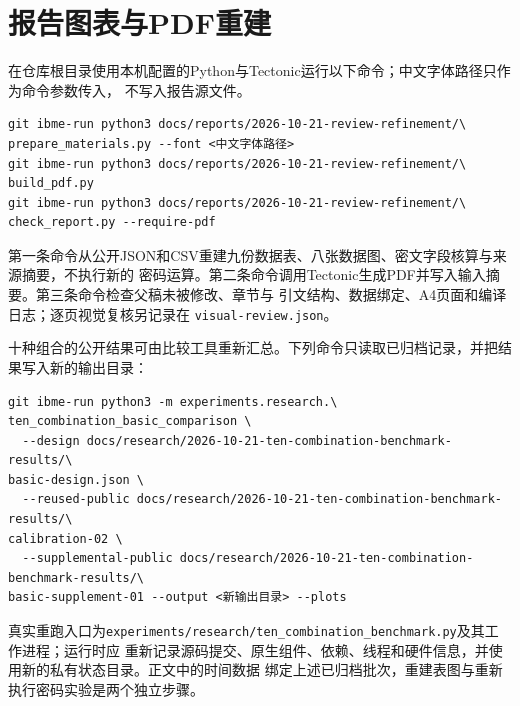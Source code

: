 \section{报告图表与PDF重建}

在仓库根目录使用本机配置的Python与Tectonic运行以下命令；中文字体路径只作为命令参数传入，
不写入报告源文件。

\begingroup\footnotesize
\begin{verbatim}
git ibme-run python3 docs/reports/2026-10-21-review-refinement/\
prepare_materials.py --font <中文字体路径>
git ibme-run python3 docs/reports/2026-10-21-review-refinement/\
build_pdf.py
git ibme-run python3 docs/reports/2026-10-21-review-refinement/\
check_report.py --require-pdf
\end{verbatim}
\endgroup

第一条命令从公开JSON和CSV重建九份数据表、八张数据图、密文字段核算与来源摘要，不执行新的
密码运算。第二条命令调用Tectonic生成PDF并写入输入摘要。第三条命令检查父稿未被修改、章节与
引文结构、数据绑定、A4页面和编译日志；逐页视觉复核另记录在
\nolinkurl{visual-review.json}。

十种组合的公开结果可由比较工具重新汇总。下列命令只读取已归档记录，并把结果写入新的输出目录：

\begingroup\footnotesize
\begin{verbatim}
git ibme-run python3 -m experiments.research.\
ten_combination_basic_comparison \
  --design docs/research/2026-10-21-ten-combination-benchmark-results/\
basic-design.json \
  --reused-public docs/research/2026-10-21-ten-combination-benchmark-results/\
calibration-02 \
  --supplemental-public docs/research/2026-10-21-ten-combination-benchmark-results/\
basic-supplement-01 --output <新输出目录> --plots
\end{verbatim}
\endgroup

真实重跑入口为\nolinkurl{experiments/research/ten_combination_benchmark.py}及其工作进程；运行时应
重新记录源码提交、原生组件、依赖、线程和硬件信息，并使用新的私有状态目录。正文中的时间数据
绑定上述已归档批次，重建表图与重新执行密码实验是两个独立步骤。
